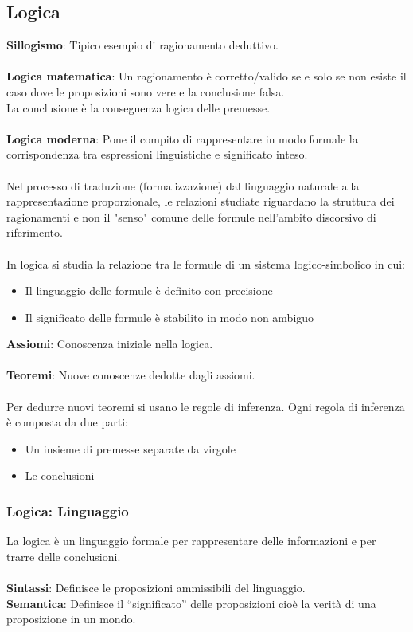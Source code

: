 \documentclass[../main.tex]{subfiles}
\begin{document}
	\subsection{Logica}
	\textbf{Sillogismo}: Tipico esempio di ragionamento deduttivo.\\\\
	\textbf{Logica matematica}: Un ragionamento è corretto/valido se e solo se non esiste il caso dove le proposizioni sono vere e la conclusione falsa. \\
	La conclusione è la conseguenza logica delle premesse.\\\\
	\textbf{Logica moderna}: Pone il compito di rappresentare in modo formale la corrispondenza tra espressioni linguistiche e significato inteso.\\\\
	Nel processo di traduzione (formalizzazione) dal linguaggio naturale alla rappresentazione proporzionale, le relazioni studiate riguardano la struttura dei ragionamenti e non il "senso" comune delle formule nell’ambito discorsivo di riferimento.\\\\
	In logica si studia la relazione tra le formule di un sistema logico-simbolico in cui:
	\begin{itemize}
		\item Il linguaggio delle formule è definito con precisione
		\item Il significato delle formule è stabilito in modo non ambiguo
	\end{itemize}
	\textbf{Assiomi}: Conoscenza iniziale nella logica.\\\\
	\textbf{Teoremi}: Nuove conoscenze dedotte dagli assiomi.\\\\
	Per dedurre nuovi teoremi si usano le regole di inferenza. Ogni regola di inferenza è composta da due parti:
	\begin{itemize}
		\item Un insieme di premesse separate da virgole
		\item Le conclusioni
	\end{itemize}
	\subsubsection{Logica: Linguaggio}
	La logica è un linguaggio formale per rappresentare delle informazioni e per trarre delle conclusioni.\\\\
	\textbf{Sintassi}: Definisce le proposizioni ammissibili del linguaggio.\\
	\textbf{Semantica}: Definisce il “significato” delle proposizioni cioè la verità di una proposizione in un mondo.
\end{document}
